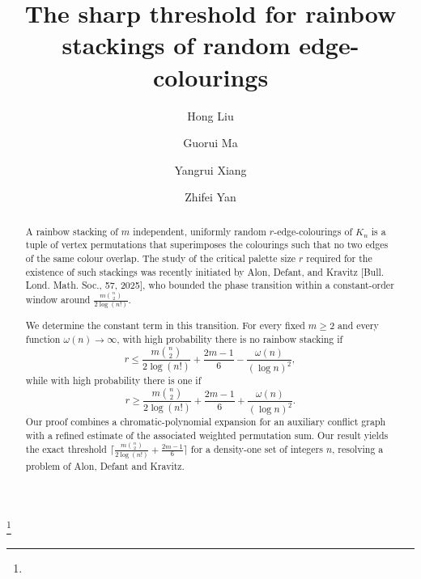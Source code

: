 \documentclass[11pt,reqno]{amsart}
\theoremstyle{definition}
\theoremstyle{remark}
\renewcommand\le{\leqslant}
\renewcommand\ge{\geqslant}
\renewcommand\to{\rightarrow}
\begin{document}
\title{The sharp threshold for rainbow stackings of random edge-colourings}
\author{
Hong Liu
\and
Guorui Ma
\and 
Yangrui Xiang
\and
Zhifei Yan}

\address{ECOPRO, Institute for Basic Science, 55 Expo-ro, Yuseong-gu, Daejeon, 34126, Korea}


\address{Shanghai Institute for Mathematics and Interdisciplinary Sciences (SIMIS), Shanghai, 200433, China; Research institute of Intelligent Complex Systems, Fudan University, Shanghai, 200433, China}

\address{Department of Mathematics, Louisiana State University, 303 Lockett Hall, Baton Rouge, Louisiana, 70801, USA}



\thanks{}

\begin{abstract}
A rainbow stacking of $m$ independent, uniformly random $r$-edge-colourings of $K_n$ is a tuple of vertex permutations that superimposes the colourings such that no two edges of the same colour overlap. The study of the critical palette size $r$ required for the existence of such stackings was recently initiated by Alon, Defant, and Kravitz [Bull. Lond. Math. Soc., 57, 2025], who bounded the phase transition within a constant-order window around $\frac{m\binom{n}{2}}{2\log(n!)}$.



We determine the constant term in this transition.  For every fixed $m\ge2$ and every function $\omega(n)\to\infty$, with high probability there is no rainbow stacking if
\[
        r\le \frac{m\binom{n}{2}}{2\log(n!)}+\frac{2m-1}{6}-\frac{\omega(n)}{(\log n)^2},
\]
while with high probability there is one if
\[
        r\ge \frac{m\binom{n}{2}}{2\log(n!)}+\frac{2m-1}{6}+\frac{\omega(n)}{(\log n)^2}.
\]
Our proof combines a chromatic-polynomial expansion for an auxiliary conflict graph with a refined estimate of the associated weighted permutation sum.  Our result yields the exact threshold $\Big\lceil \frac{m\binom{n}{2}}{2\log(n!)}+\frac{2m-1}{6}\Big\rceil$ for a density-one set of integers $n$, resolving a problem of Alon, Defant and Kravitz.
\end{abstract}
	
\maketitle
\end{document}
